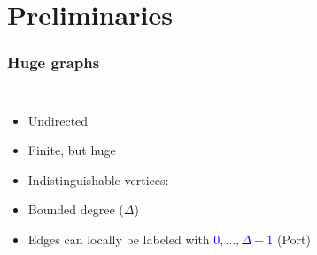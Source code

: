 \documentclass{beamer}
\begin{document}
\section{Preliminaries}
\begin{frame}
  \frametitle{Huge graphs}
  \begin{columns}
    \begin{itemize}
      \item Undirected
      \item Finite, but huge
      \item Indistinguishable vertices:
      \parbox{\baselineskip}{
        \resizebox{!}{\baselineskip}{
          \begin{tikzpicture}
            \node[node] {};
          \end{tikzpicture}
        }
      }
      \item Bounded degree ($\Delta$)
      \item Edges can locally be labeled with
        \textcolor{blue}{$0,\dots,\Delta-1$} (Port)
    \end{itemize}
    \begin{center}
      \resizebox{\textwidth}{!}{}
    \end{center}
  \end{columns}
\end{frame}
\end{document}
